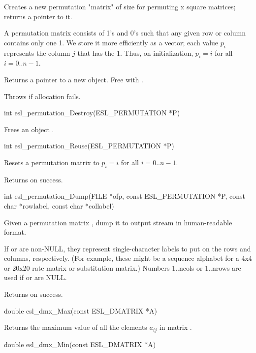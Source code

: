 \begin{sreapi}
Creates a new permutation "matrix" of size  for
permuting  x  square matrices; returns a 
pointer to it.

A permutation matrix consists of 1's and 0's such that
any given row or column contains only one 1. We store it
more efficiently as a vector; each value $p_i$
represents the column $j$ that has the 1. Thus, on
initialization, $p_i = i$ for all $i = 0..n-1$.

Returns a pointer to a new  object. Free with 
.

Throws  if allocation fails.


\hypertarget{func:esl_permutation_Destroy()}
{\item[int esl\_permutation\_Destroy(ESL\_PERMUTATION *P)]}

Frees an  object .


\hypertarget{func:esl_permutation_Reuse()}
{\item[int esl\_permutation\_Reuse(ESL\_PERMUTATION *P)]}

Resets a permutation matrix  to
$p_i = i$ for all $i = 0..n-1$.

Returns  on success.           


\hypertarget{func:esl_permutation_Dump()}
{\item[int esl\_permutation\_Dump(FILE *ofp, const ESL\_PERMUTATION *P, const char *rowlabel, const char *collabel)]}

Given a permutation matrix , dump it to output stream 
in human-readable format.

If  or  are non-NULL, they represent
single-character labels to put on the rows and columns,
respectively. (For example, these might be a sequence
alphabet for a 4x4 or 20x20 rate matrix or substitution
matrix.)  Numbers 1..ncols or 1..nrows are used if
 or  are NULL.

Returns  on success.


\hypertarget{func:esl_dmx_Max()}
{\item[double esl\_dmx\_Max(const ESL\_DMATRIX *A)]}

Returns the maximum value of all the elements $a_{ij}$ in matrix .


\hypertarget{func:esl_dmx_Min()}
{\item[double esl\_dmx\_Min(const ESL\_DMATRIX *A)]}


\end{sreapi}

